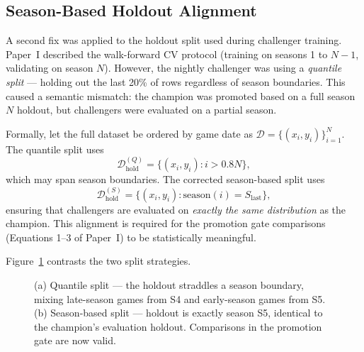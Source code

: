 \documentclass[conference]{IEEEtran}
\begin{document}
\subsection{Season-Based Holdout Alignment}

A second fix was applied to the holdout split used during challenger
training.  Paper~I described the walk-forward CV protocol (training on
seasons 1 to $N{-}1$, validating on season $N$).  However, the
nightly challenger was using a \emph{quantile split} — holding out the
last 20\% of rows regardless of season boundaries.  This caused a
semantic mismatch: the champion was promoted based on a full
season~$N$ holdout, but challengers were evaluated on a partial
season.

Formally, let the full dataset be ordered by game date as
$\mathcal{D} = \{(x_i, y_i)\}_{i=1}^{N}$.  The quantile split uses
\[
  \mathcal{D}_\text{hold}^{(Q)} = \{(x_i,y_i) : i > 0.8N\},
\]
which may span season boundaries.  The corrected season-based split
uses
\[
  \mathcal{D}_\text{hold}^{(S)} = \{(x_i,y_i) : \text{season}(i) = S_\text{last}\},
\]
ensuring that challengers are evaluated on \emph{exactly the same
distribution} as the champion.  This alignment is required for the
promotion gate comparisons (Equations 1--3 of Paper~I) to be
statistically meaningful.

Figure~\ref{fig:holdout} contrasts the two split strategies.

\begin{figure}[t]
\centering
{}
\caption{(a) Quantile split — the holdout straddles a season boundary,
mixing late-season games from S4 and early-season games from S5.
(b) Season-based split — holdout is exactly season S5, identical to
the champion's evaluation holdout.  Comparisons in the promotion gate
are now valid.}
\label{fig:holdout}
\end{figure}
\end{document}
